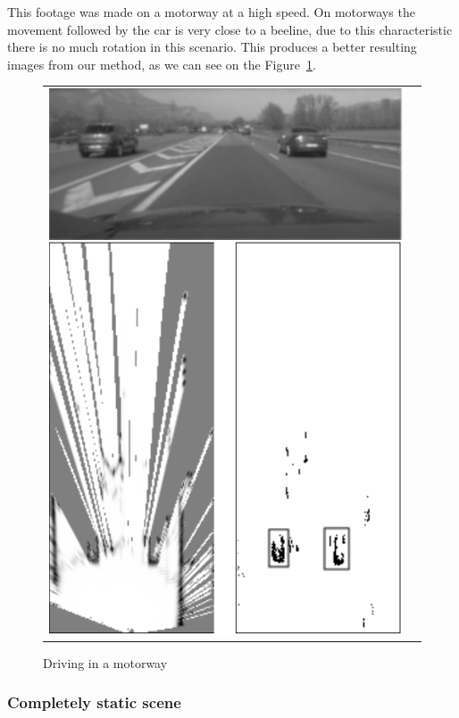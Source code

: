This footage was made on a motorway at a high speed. On motorways the movement followed by the car is very close to a beeline, due to this characteristic there is no much rotation in this scenario. This produces a better resulting images from our method, as we can see on the Figure~\ref{fig:result:scenetwocarshighway}.

\begin{figure}[H]
   \centering
     \begin{tabular}{lr}
       \includegraphics[scale=0.60]{img/fig:result:scenetwocarshighway}
     \end{tabular}
   \caption{Driving in a motorway}
   \label{fig:result:scenetwocarshighway}
\end{figure}

\subsubsection{Completely static scene}

